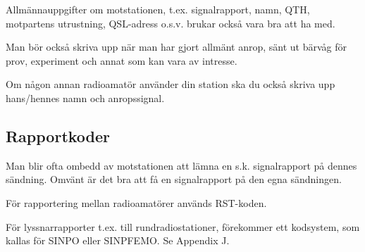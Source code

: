 Allmännauppgifter om motstationen, t.ex.  signalrapport, namn, QTH,
motpartens utrustning, QSL-adress o.s.v. brukar också vara bra att ha
med.

Man bör också skriva upp när man har gjort allmänt anrop, sänt ut
bärvåg för prov, experiment och annat som kan vara av intresse.

Om någon annan radioamatör använder din station ska du också skriva
upp hans/hennes namn och anropssignal.

\subsection{Rapportkoder}

Man blir ofta ombedd av motstationen att lämna en s.k. signalrapport
på dennes sändning. Omvänt är det bra att få en signalrapport på den
egna sändningen.

För rapportering mellan radioamatörer används RST-koden.

För lyssnarrapporter t.ex. till rundradiostationer, förekommer ett
kodsystem, som kallas för SINPO eller SINPFEMO.  Se Appendix J.

